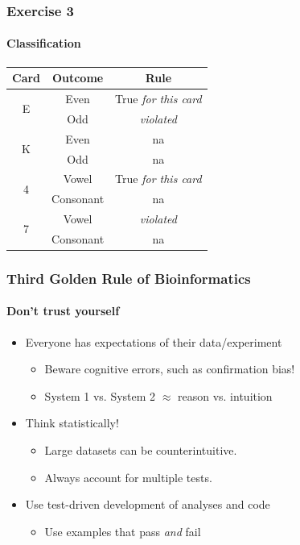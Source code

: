 \documentclass[table]{beamer}
\begin{document}
  \begin{frame}
    \frametitle{Exercise 3}
    \framesubtitle{Classification}
    \begin{center}
	\begin{tabular}{c|c|c}
	  Card & Outcome & Rule \\
	  \hline
	  \hline
	    \multirow{2}{*}{E} & Even & True \emph{for this card} \\
	                                & Odd & \emph{violated} \\
	  \hline
	    \multirow{2}{*}{K} & Even & na \\
	                                & Odd & na \\	    
	  \hline
	    \multirow{2}{*}{4} & Vowel & True \emph{for this card} \\
	                                & Consonant & na \\
	  \hline
	    \multirow{2}{*}{7} & Vowel & \emph{violated} \\
	                                & Consonant & na \\	    
	\end{tabular}
    \end{center}
  \end{frame}

  \begin{frame}
    \frametitle{Third Golden Rule of Bioinformatics}
    \framesubtitle{Don't trust yourself}
	\begin{itemize}
	  \item Everyone has expectations of their data/experiment
	    \begin{itemize}
	      \item Beware cognitive errors, such as confirmation bias!
	      \item System 1 vs. System 2 $\approx$ reason vs. intuition
	    \end{itemize}
	  \item Think statistically! 
	    \begin{itemize}
	      \item Large datasets can be counterintuitive.
	      \item Always account for multiple tests.
	    \end{itemize}
	  \item Use test-driven development of analyses and code
	    \begin{itemize}
	      \item Use examples that pass \textit{and} fail
	    \end{itemize}	  
	\end{itemize}
  \end{frame}
\end{document}
